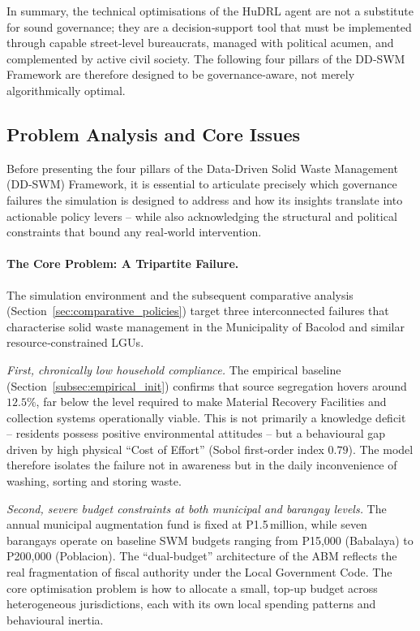 In summary, the technical optimisations of the HuDRL agent are not a substitute for sound governance; they are a decision‑support tool that must be implemented through capable street‑level bureaucrats, managed with political acumen, and complemented by active civil society. The following four pillars of the DD‑SWM Framework are therefore designed to be governance‑aware, not merely algorithmically optimal.

\subsection{Problem Analysis and Core Issues}
\label{subsec:problem_analysis}

Before presenting the four pillars of the Data‑Driven Solid Waste Management (DD‑SWM) Framework, it is essential to articulate precisely which governance failures the simulation is designed to address and how its insights translate into actionable policy levers – while also acknowledging the structural and political constraints that bound any real‑world intervention.

\paragraph{The Core Problem: A Tripartite Failure.}
The simulation environment and the subsequent comparative analysis (Section~\ref{sec:comparative_policies}) target three interconnected failures that characterise solid waste management in the Municipality of Bacolod and similar resource‑constrained LGUs.

\emph{First, chronically low household compliance.} The empirical baseline (Section~\ref{subsec:empirical_init}) confirms that source segregation hovers around \(12.5\%\), far below the level required to make Material Recovery Facilities and collection systems operationally viable. This is not primarily a knowledge deficit – residents possess positive environmental attitudes – but a behavioural gap driven by high physical “Cost of Effort” (Sobol first‑order index \(0.79\)). The model therefore isolates the failure not in awareness but in the daily inconvenience of washing, sorting and storing waste.

\emph{Second, severe budget constraints at both municipal and barangay levels.} The annual municipal augmentation fund is fixed at P1.5 million, while seven barangays operate on baseline SWM budgets ranging from P15,000 (Babalaya) to P200,000 (Poblacion). The “dual‑budget” architecture of the ABM reflects the real fragmentation of fiscal authority under the Local Government Code. The core optimisation problem is how to allocate a small, top‑up budget across heterogeneous jurisdictions, each with its own local spending patterns and behavioural inertia.

